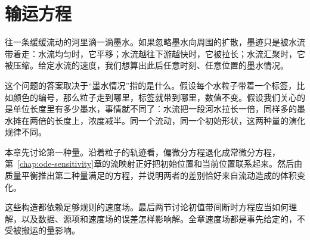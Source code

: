 \chapter{输运方程}
\label{chap:transport-equations}

往一条缓缓流动的河里滴一滴墨水。如果忽略墨水向周围的扩散，墨迹只是被水流带着走：水流均匀时，它平移；水流越往下游越快时，它被拉长；水流汇聚时，它被压缩。给定水流的速度，我们想算出此后任意时刻、任意位置的墨水情况。

这个问题的答案取决于“墨水情况”指的是什么。假设每个水粒子带着一个标签，比如颜色的编号，那么粒子走到哪里，标签就带到哪里，数值不变。假设我们关心的是单位长度里有多少墨水，事情就不同了：水流把一段河水拉长一倍，同样多的墨水摊在两倍的长度上，浓度减半。同一个流动，同一个初始形状，这两种量的演化规律不同。

本章先讨论第一种量。沿着粒子的轨迹看，偏微分方程退化成常微分方程，第~\ref{chap:ode-sensitivity}章的流映射正好把初始位置和当前位置联系起来。然后由质量平衡推出第二种量满足的方程，并说明两者的差别恰好来自流动造成的体积变化。

这些构造都依赖足够规则的速度场。最后两节讨论初值带间断时方程应当如何理解，以及数据、源项和速度场的误差怎样影响解。全章速度场都是事先给定的，不受被搬运的量影响。









